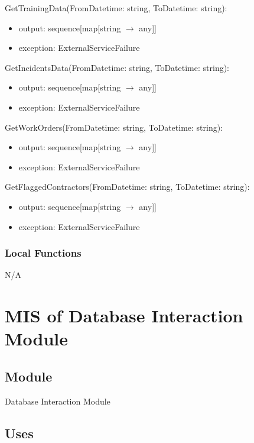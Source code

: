 \documentclass[12pt, titlepage]{article}
\begin{document}
\noindent GetTrainingData(FromDatetime: string, ToDatetime: string):
\begin{itemize}
  \item output: sequence[map[string $\rightarrow$ any]]
  \item exception: ExternalServiceFailure
\end{itemize}

\noindent GetIncidentsData(FromDatetime: string, ToDatetime: string):
\begin{itemize}
  \item output: sequence[map[string $\rightarrow$ any]]
  \item exception: ExternalServiceFailure
\end{itemize}

\noindent GetWorkOrders(FromDatetime: string, ToDatetime: string):
\begin{itemize}
  \item output: sequence[map[string $\rightarrow$ any]]
  \item exception: ExternalServiceFailure
\end{itemize}

\noindent GetFlaggedContractors(FromDatetime: string, ToDatetime: string):
\begin{itemize}
  \item output: sequence[map[string $\rightarrow$ any]]
  \item exception: ExternalServiceFailure
\end{itemize}

\subsubsection{Local Functions}

N/A

\section{MIS of Database Interaction Module} \label{Module}

\subsection{Module}

Database Interaction Module

\subsection{Uses}
\end{document}
